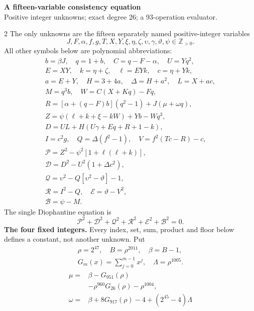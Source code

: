 \documentclass[10pt]{article}
\begin{document}
\begin{center}
{\large\bfseries A fifteen-variable consistency equation}\\[-1pt]
{\small Positive integer unknowns; exact degree 26; a 93-operation evaluator.}
\end{center}\vspace{-8pt}
\begin{multicols}{2}
\fontsize{8.6}{9.1}\selectfont
The only unknowns are the fifteen separately named positive-integer variables
\[
J,F,\alpha,f,g,T,X,Y,\xi,\eta,\zeta,\upsilon,\gamma,\vartheta,\psi\in\mathbb Z_{>0}.
\]
All other symbols below are polynomial abbreviations:
\[
\begin{gathered}
b=\beta J,\quad q=1+b,\quad C=q-F-\alpha,\quad U=Yq^2,\\
E=XY,\quad k=\eta+\zeta,\quad \ell=EYk,\quad c=\eta+Yk,\\
a=E+Y,\quad H=3+4a,\quad\Delta=H+a^2,\quad L=X+ac,\\
M=q^3b,\quad W=C(X+Kq)-Fq,\\
R=[\alpha+(q-F)b](q^2-1)+J(\mu+\omega q),\\
Z=\psi(\ell+k+\xi-kW)+Yb-Wq^3,\\
D=UL+H(U\gamma+Eq+R+1-k),\\
I=c^2g,\quad Q=\Delta(f^2-1),\quad V=f^2(Tc-R)-c,\\
\mathcal{P}=Z^2-\psi^2[1+\ell(\ell+k)],\\
\mathcal{D}=D^2-U^2(1+\Delta c^2),\\
\mathcal{Q}=\upsilon^2-Q[\upsilon^2-\vartheta]-1,\\
\mathcal{R}=I^2-Q,\quad \mathcal{E}=\vartheta-V^2,\\
\mathcal{B}=\psi-M.
\end{gathered}
\]
The single Diophantine equation is
\[
\boxed{\mathcal{P}^2+\mathcal{D}^2+\mathcal{Q}^2+\mathcal{R}^2+\mathcal{E}^2+\mathcal{B}^2=0.}
\]
\textbf{The four fixed integers.}
Every index, set, sum, product and floor below defines a constant, not
another unknown. Put
\[
\begin{gathered}
\rho=2^{47},\quad B=\rho^{2011},\quad\beta=B-1,\\
G_m(x)=\sum_{j=0}^{m-1}x^j,\quad
\Lambda=\rho^{1005}.
\end{gathered}
\]
\begin{align*}
\mu={}&\beta-G_{951}(\rho)\\
&-\rho^{960}G_{26}(\rho)-\rho^{1004},\\
\omega={}&\beta+8G_{917}(\rho)-4+(2^{45}-4)\Lambda\\

\end{align*}
\end{multicols}
\end{document}
